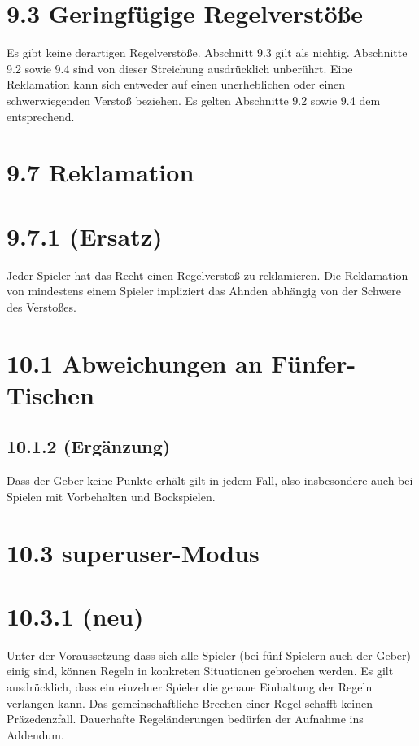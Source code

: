 \section*{9.3 Geringfügige Regelverstöße}

Es gibt keine derartigen Regelverstöße. Abschnitt 9.3 gilt als nichtig.
Abschnitte 9.2 sowie 9.4 sind von dieser Streichung ausdrücklich unberührt.
Eine Reklamation kann sich entweder auf einen unerheblichen oder einen
schwerwiegenden Verstoß beziehen. Es gelten Abschnitte 9.2 sowie 9.4 dem
entsprechend.

\section*{9.7 Reklamation}

\section*{9.7.1 (Ersatz)}

Jeder Spieler hat das Recht einen Regelverstoß zu reklamieren. Die Reklamation
von mindestens einem Spieler impliziert das Ahnden abhängig von der Schwere des
Verstoßes.

\section*{10.1 Abweichungen an Fünfer-Tischen}

\subsection*{10.1.2 (Ergänzung)}

Dass der Geber keine Punkte erhält gilt in jedem Fall, also insbesondere auch
bei Spielen mit Vorbehalten und Bockspielen.

\section*{10.3 superuser-Modus}

\section*{10.3.1 (neu)}

Unter der Voraussetzung dass sich alle Spieler (bei fünf Spielern auch der
Geber) einig sind, können Regeln in konkreten Situationen gebrochen werden. Es
gilt ausdrücklich, dass ein einzelner Spieler die genaue Einhaltung der Regeln
verlangen kann. Das gemeinschaftliche Brechen einer Regel schafft keinen
Präzedenzfall. Dauerhafte Regeländerungen bedürfen der Aufnahme ins Addendum.


